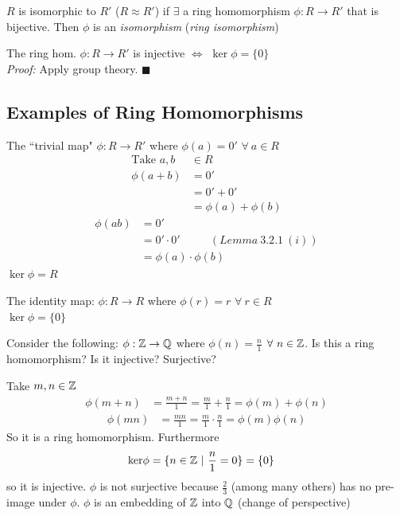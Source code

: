 \begin{definition}
    $R$ is isomorphic to $R'$ ($R\approx R'$) if $\exists$ a ring homomorphism $\phi : R \rightarrow R'$ that is bijective. Then $\phi$ is an \textit{isomorphism} (\textit{ring isomorphism})
\end{definition}

\begin{lemma}
    The ring hom. $\phi : R \rightarrow R'$ is injective $\iff$ $\ker\phi = \{0\}$ \steezybreak\\
    \textit{Proof:} Apply group theory. $\blacksquare$
\end{lemma}
\subsection*{Examples of Ring Homomorphisms}
\begin{example}
    The ``trivial map" $\phi: R \rightarrow R'$ where $\phi(a)=0'$ $\forall \ a \in R$
    \begin{align}
        \text{Take }a,b \ & \in R \nonumber \\
        \phi(a+b)&= 0' \nonumber \\
        &= 0' + 0' \nonumber \\
        &= \phi(a) + \phi(b) \nonumber
    \end{align}
    \begin{align}
        \phi(ab)&= 0' \nonumber \\
        &= 0'\cdot 0' \ \ \ \ \ \ \ \ \ \ \ \ (Lemma \ 3.2.1 \ (i)) \nonumber \\
        &= \phi(a)\cdot \phi(b) \nonumber
    \end{align}
    $\ker\phi = R$
\end{example}

\begin{example}
    The identity map: $\phi : R \rightarrow R$ where $\phi(r)=r$ $\forall \ r \in R$ \steezybreak\\
    $\ker\phi = \{0\}$
\end{example}

\begin{example}
Consider the following: $\phi: {\mathbb{ Z}} \rightarrow {\mathbb{ Q}}$ where $\phi(n) = \frac{n}{1}$ $\forall \ n \in {\mathbb{ Z}}$. Is this a ring homomorphism? Is it injective? Surjective?

Take $m,n \in {\mathbb{ Z}}$
\begin{align}
    \phi(m+n) &= \frac{m+n}{1} = \frac{m}{1}+\frac{n}{1}= \phi(m)+\phi(n) \nonumber
\end{align}
\begin{align}
    \phi(mn) &= \frac{mn}{1} = \frac{m}{1}\cdot\frac{n}{1}= \phi(m)\phi(n) \nonumber
\end{align}
So it is a ring homomorphism. Furthermore
\begin{align}
    \text{ker} \phi &= \{n\in{\mathbb{ Z}} \ | \ \frac{n}{1}=0\} = \{0\} \nonumber
\end{align}
so it is injective. $\phi$ is not surjective because $\frac{2}{3}$ (among many others) has no pre-image under $\phi$. $\phi$ is an embedding of ${\mathbb{ Z}}$ into ${\mathbb{ Q}}$ (change of perspective)
\end{example}

